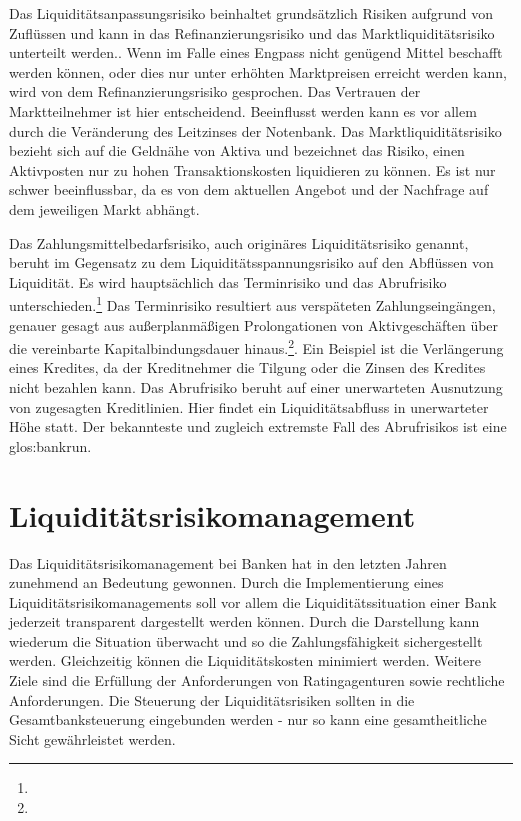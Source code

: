 \begin{onehalfspacing}
Das Liquiditätsanpassungsrisiko beinhaltet grundsätzlich Risiken aufgrund von Zuflüssen und kann in das Refinanzierungsrisiko und das Marktliquiditätsrisiko unterteilt werden.. Wenn im Falle eines Engpass nicht genügend Mittel beschafft werden können, oder dies nur unter erhöhten Marktpreisen erreicht werden kann, wird von dem Refinanzierungsrisiko gesprochen. Das Vertrauen der Marktteilnehmer ist hier entscheidend. Beeinflusst werden kann es vor allem durch die Veränderung des Leitzinses der Notenbank. Das Marktliquiditätsrisiko bezieht sich auf die Geldnähe von Aktiva und bezeichnet das Risiko, einen Aktivposten nur zu hohen Transaktionskosten liquidieren zu können. Es ist nur schwer beeinflussbar, da es von dem aktuellen Angebot und der Nachfrage auf dem jeweiligen Markt abhängt.

Das Zahlungsmittelbedarfsrisiko, auch originäres Liquiditätsrisiko genannt, beruht im Gegensatz zu dem Liquiditätsspannungsrisiko auf den Abflüssen von Liquidität. Es wird hauptsächlich das Terminrisiko und das Abrufrisiko unterschieden.\footnote{ } Das Terminrisiko resultiert aus verspäteten Zahlungseingängen, genauer gesagt aus außerplanmäßigen Prolongationen von Aktivgeschäften über die vereinbarte Kapitalbindungsdauer hinaus.\footnote{ }. Ein Beispiel ist die Verlängerung eines Kredites, da der Kreditnehmer die Tilgung oder die Zinsen des Kredites nicht bezahlen kann. Das Abrufrisiko beruht auf einer unerwarteten Ausnutzung von zugesagten Kreditlinien. Hier findet ein Liquiditätsabfluss in unerwarteter Höhe statt. Der bekannteste und zugleich extremste Fall des Abrufrisikos ist eine \gls{glos:bankrun}.


\section{Liquiditätsrisikomanagement}
Das Liquiditätsrisikomanagement bei Banken hat in den letzten Jahren zunehmend an Bedeutung gewonnen. Durch die Implementierung eines Liquiditätsrisikomanagements  soll vor allem die Liquiditätssituation einer Bank jederzeit transparent dargestellt werden können. Durch die Darstellung kann wiederum die Situation überwacht und so die Zahlungsfähigkeit sichergestellt werden. Gleichzeitig können die Liquiditätskosten minimiert werden. Weitere Ziele sind die Erfüllung der Anforderungen von Ratingagenturen sowie rechtliche Anforderungen. Die Steuerung der Liquiditätsrisiken sollten in die Gesamtbanksteuerung eingebunden werden - nur so kann eine gesamtheitliche Sicht gewährleistet werden.


\end{onehalfspacing}
